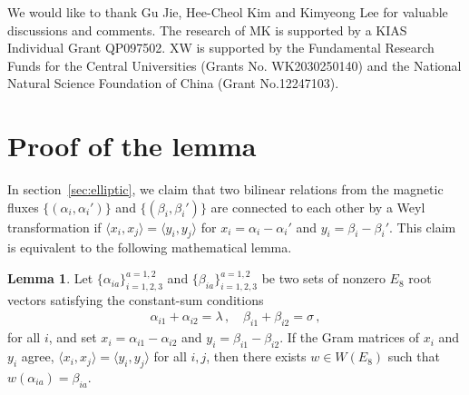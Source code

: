 \documentclass[11pt, a4paper]{article}
\theoremstyle{definition}
\newtheorem*{lemma}{Lemma}
\begin{document}
\acknowledgments

We would like to thank Gu Jie, Hee-Cheol Kim and Kimyeong Lee for valuable discussions and comments. The research of MK is supported by a KIAS Individual Grant QP097502. XW is supported by the Fundamental Research Funds for the Central Universities (Grants No. WK2030250140) and the National Natural Science Foundation of China (Grant No.12247103).


\appendix


\section{Proof of the lemma} \label{app:lemma}

In section~\ref{sec:elliptic}, we claim that two bilinear relations from the magnetic fluxes $ \{(\alpha_i, \alpha_i')\} $ and $ \{(\beta_i, \beta_i')\} $ are connected to each other by a Weyl transformation if $ \langle x_i, x_j \rangle = \langle y_i, y_j \rangle $ for $ x_i=\alpha_i-\alpha_i' $ and $ y_i=\beta_i-\beta_i' $. This claim is equivalent to the following mathematical lemma.
\begin{lemma}
    Let $ \{\alpha_{ia}\}_{i=1,2,3}^{a=1,2} $ and $ \{\beta_{ia}\}_{i=1,2,3}^{a=1,2} $ be two sets of nonzero $ E_8 $ root vectors satisfying the constant-sum conditions
    \begin{align}
        \alpha_{i1}+\alpha_{i2}=\lambda \, , \quad
        \beta_{i1}+\beta_{i2}=\sigma \, ,
    \end{align}
    for all $ i $, and set $ x_i = \alpha_{i1}-\alpha_{i2} $ and $ y_i=\beta_{i1}-\beta_{i2} $. If the Gram matrices of $ x_i $ and $ y_i $ agree, $ \langle x_i, x_j \rangle = \langle y_i, y_j \rangle $ for all $ i,j $, then there exists $ w \in W(E_8) $ such that $ w(\alpha_{ia}) = \beta_{ia} $.
\end{lemma}
\end{document}
